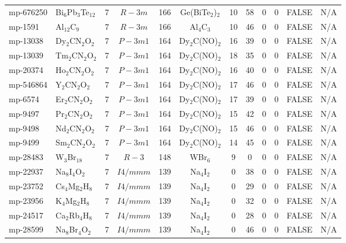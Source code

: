 {\begin{longtable}{llcccccccccc}
    mp-676250 & Bi$_{6}$Pb$_{3}$Te$_{12}$ & 7     & $R-3m$ & 166   & Ge(BiTe$_{2}$)$_{2}$ & 10    & 58    & 0     & 0     & FALSE & N/A \\
    mp-1591 & Al$_{12}$C$_{9}$ & 7     & $R-3m$ & 166   & Al$_{4}$C$_{3}$ & 10    & 46    & 0     & 0     & FALSE & N/A \\
    mp-13038 & Dy$_{2}$CN$_{2}$O$_{2}$ & 7     & $P-3m1$ & 164   & Dy$_{2}$C(NO)$_{2}$ & 16    & 39    & 0     & 0     & FALSE & N/A \\
    mp-13039 & Tm$_{2}$CN$_{2}$O$_{2}$ & 7     & $P-3m1$ & 164   & Dy$_{2}$C(NO)$_{2}$ & 18    & 35    & 0     & 0     & FALSE & N/A \\
    mp-20374 & Ho$_{2}$CN$_{2}$O$_{2}$ & 7     & $P-3m1$ & 164   & Dy$_{2}$C(NO)$_{2}$ & 16    & 40    & 0     & 0     & FALSE & N/A \\
    mp-546864 & Y$_{2}$CN$_{2}$O$_{2}$ & 7     & $P-3m1$ & 164   & Dy$_{2}$C(NO)$_{2}$ & 17    & 46    & 0     & 0     & FALSE & N/A \\
    mp-6574 & Er$_{2}$CN$_{2}$O$_{2}$ & 7     & $P-3m1$ & 164   & Dy$_{2}$C(NO)$_{2}$ & 17    & 39    & 0     & 0     & FALSE & N/A \\
    mp-9497 & Pr$_{2}$CN$_{2}$O$_{2}$ & 7     & $P-3m1$ & 164   & Dy$_{2}$C(NO)$_{2}$ & 15    & 42    & 0     & 0     & FALSE & N/A \\
    mp-9498 & Nd$_{2}$CN$_{2}$O$_{2}$ & 7     & $P-3m1$ & 164   & Dy$_{2}$C(NO)$_{2}$ & 15    & 46    & 0     & 0     & FALSE & N/A \\
    mp-9499 & Sm$_{2}$CN$_{2}$O$_{2}$ & 7     & $P-3m1$ & 164   & Dy$_{2}$C(NO)$_{2}$ & 14    & 45    & 0     & 0     & FALSE & N/A \\
    mp-28483 & W$_{3}$Br$_{18}$ & 7     & $R-3$ & 148   & WBr$_{6}$ & 9     & 0     & 0     & 0     & FALSE & N/A \\
    mp-22937 & Na$_{8}$I$_{4}$O$_{2}$ & 7     & $I4/mmm$ & 139   & Na$_{4}$I$_{2}$ & 0     & 38    & 0     & 0     & FALSE & N/A \\
    mp-23752 & Cs$_{4}$Mg$_{2}$H$_{8}$ & 7     & $I4/mmm$ & 139   & Na$_{4}$I$_{2}$ & 0     & 29    & 0     & 0     & FALSE & N/A \\
    mp-23956 & K$_{4}$Mg$_{2}$H$_{8}$ & 7     & $I4/mmm$ & 139   & Na$_{4}$I$_{2}$ & 0     & 32    & 0     & 0     & FALSE & N/A \\
    mp-24517 & Ca$_{2}$Rb$_{4}$H$_{8}$ & 7     & $I4/mmm$ & 139   & Na$_{4}$I$_{2}$ & 0     & 28    & 0     & 0     & FALSE & N/A \\
    mp-28599 & Na$_{8}$Br$_{4}$O$_{2}$ & 7     & $I4/mmm$ & 139   & Na$_{4}$I$_{2}$ & 0     & 46    & 0     & 0     & FALSE & N/A \\

\end{longtable}}
